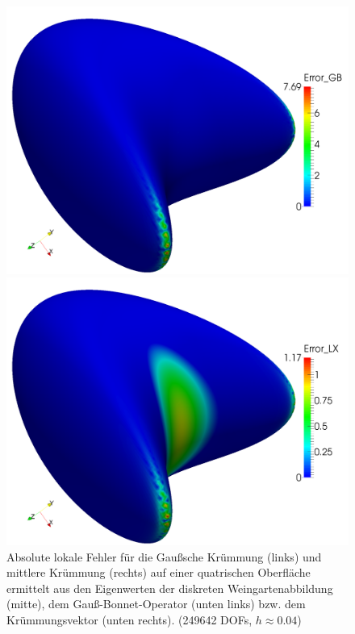 \begin{figure}
\begin{minipage}[t]{0.49\textwidth}
       \centering\includegraphics[width=\textwidth]{bilder/Curvature/heineB/GB250k.png}
    \end{minipage}\hfill
    \begin{minipage}[t]{0.49\textwidth}
       \centering\includegraphics[width=\textwidth]{bilder/Curvature/heineB/LX250k.png}
    \end{minipage}
    \caption[Fehler (Krümmungen auf quatrischer Oberfläche)]
            {Absolute lokale Fehler für die Gaußsche Krümmung (links) und mittlere Krümmung (rechts) auf
            einer quatrischen Oberfläche
             ermittelt aus den Eigenwerten der diskreten Weingartenabbildung (mitte), dem
             Gauß-Bonnet-Operator (unten links) bzw. dem Krümmungsvektor (unten rechts).
             (249642 DOFs, \( h\approx0.04 \))}
    \label{figErrCurvHeineB}
  \end{figure}

